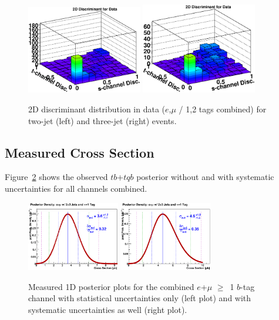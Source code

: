\begin{figure}[!h!tbp]
\includegraphics[width=0.45\textwidth]
{figures/performance/2D-Discriminant_data_2jet.eps}
\includegraphics[width=0.45\textwidth]
{figures/performance/2D-Discriminant_data_3jet.eps}
\vspace{-0.1in}
\caption[disc2d_data]{2D discriminant distribution in data
($e$,$\mu$ / 1,2 tags combined) for two-jet (left) and three-jet
(right) events.}
\label{disc2d_data}
\end{figure}

\subsection{Measured Cross Section}

Figure~\ref{meas-post-1d} shows the observed $tb$+$tqb$ posterior
without and with systematic uncertainties for all channels combined.

\begin{figure}[!h!tbp]
\includegraphics[width=0.36\textwidth]{figures/posterior/nosys/limit_TBTQ_LeptonsCombined_JetsCombined_TagsCombined.eps}
\includegraphics[width=0.36\textwidth]{figures/posterior/sys/limit_TBTQ_LeptonsCombined_JetsCombined_TagsCombined.eps}
\vspace{-0.1in}
\caption[measpost1d]{Measured 1D posterior plots for the combined
$e$+$\mu$ $\geq$~1 $b$-tag channel with statistical uncertainties only
(left plot) and with systematic uncertainties as well (right plot).}
\label{meas-post-1d}
\end{figure}


